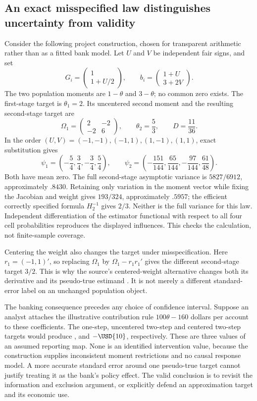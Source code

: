 \subsection{An exact misspecified law distinguishes uncertainty from validity}
Consider the following project construction, chosen for transparent
arithmetic rather than as a fitted bank model. Let $U$ and $V$ be independent
fair signs, and set
\[
 G_i=\begin{pmatrix}1\\1+U/2\end{pmatrix},\qquad
 b_i=\begin{pmatrix}1+U\\3+2V\end{pmatrix}.
\]
The two population moments are $1-\theta$ and $3-\theta$; no common
zero exists. The first-stage target is $\theta_1=2$. Its uncentered
second moment and the resulting second-stage target are
\[
 \Omega_1=\begin{pmatrix}2&-2\\-2&6\end{pmatrix},\qquad
 \theta_2=\frac53,\qquad D=\frac{11}{36}.
\]
In the order $(U,V)=(-1,-1),(-1,1),(1,-1),(1,1)$, exact substitution gives
\[
 \psi_1=\left(-\frac54,\frac34,-\frac34,\frac54\right),\qquad
 \psi_2=\left(-\frac{151}{144},\frac{65}{144},
                     -\frac{97}{144},\frac{61}{48}\right).
\]
Both have mean zero. The full second-stage asymptotic variance is
$5827/6912$, approximately $.8430$. Retaining only variation in the
moment vector while fixing the Jacobian and weight gives $193/324$,
approximately $.5957$; the efficient correctly specified formula
$H_2^{-1}$ gives $2/3$. Neither is the full variance for this law.
Independent differentiation of the estimator functional with respect to
all four cell probabilities reproduces the displayed influences.
This checks the calculation, not finite-sample coverage.

Centering the weight also changes the target under misspecification.
Here $r_1=(-1,1)'$, so replacing $\Omega_1$ by
$\Omega_1-r_1r_1'$ gives the different second-stage target $3/2$.
This is why the source's centered-weight alternative changes both
its derivative and its pseudo-true estimand
\citep[Section 4, Remark 2]{rel32hkl}. It is not merely a different
standard-error label on an unchanged population object.

The banking consequence precedes any choice of confidence interval.
Suppose an analyst attaches the illustrative contribution rule
$100\theta-160$ dollars per account to these coefficients. The one-step,
uncentered two-step and centered two-step targets would produce
,  and $-\USD{10}$, respectively. These are three
values of an assumed reporting map. None is an identified intervention
value, because the construction supplies inconsistent moment restrictions
and no causal response model. A more accurate standard error around one
pseudo-true target cannot justify treating it as the bank's policy effect.
The valid conclusion is to revisit the information and exclusion argument,
or explicitly defend an approximation target and its economic use.

